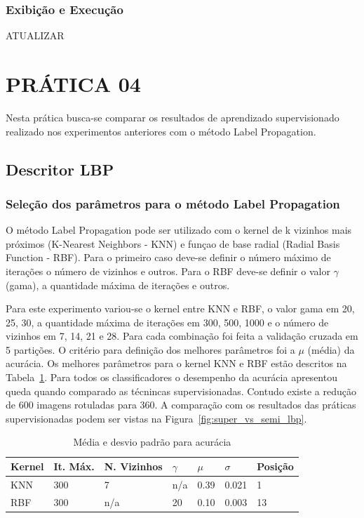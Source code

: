 \documentclass[a4paper, 12 pt, conference]{ieeeconf}  %
\begin{document}
\subsubsection{Exibição e Execução} ATUALIZAR

\section{PRÁTICA 04}
\label{pratica04}
Nesta prática busca-se comparar os resultados de aprendizado supervisionado realizado nos experimentos anteriores com o método Label Propagation.

\subsection{Descritor LBP}
\subsubsection{Seleção dos parâmetros para o método Label Propagation}
O método Label Propagation pode ser utilizado com o kernel de k vizinhos mais próximos (K-Nearest Neighbors - KNN) e funçao de base radial (Radial Basis Function - RBF). Para o  primeiro caso deve-se definir o número máximo de iterações o número de vizinhos e outros. Para o RBF deve-se definir o valor $\gamma$ (gama), a quantidade máxima de iterações e outros.

Para este experimento variou-se o kernel entre KNN e RBF, o valor gama em 20, 25, 30, a quantidade máxima de iterações em 300, 500, 1000 e o número de vizinhos em 7, 14, 21 e 28. Para cada combinação foi feita a validação cruzada em 5 partições. O critério para definição dos melhores parâmetros foi a $\mu$ (média) da acurácia. Os melhores parâmetros para o kernel KNN e RBF estão descritos na Tabela~\ref{tab:meida_acuracia_lp_lbp}. Para todos os classificadores o desempenho da acurácia apresentou queda quando comparado as técnincas supervisionadas. Contudo existe a redução de 600 imagens rotuladas para 360. A comparação com os resultados das práticas supervisionadas podem ser vistas na Figura~\ref{fig:super_vs_semi_lbp}.


\begin{table}[!htbp]
    \caption{Média e desvio padrão para acurácia}
    \begin{center}
        \begin{tabular}{lllllll}
        	Kernel & It. Máx. & N. Vizinhos & $\gamma$ & $\mu$ & $\sigma$ & Posição \\
        	\hline
        	KNN    & 300             & 7                  & n/a  & 0.39       & 0.021               & 1       \\
        	\hline
        	RBF    & 300             & n/a                & 20   & 0.10       & 0.003               & 13      \\
        \end{tabular}
    \label{tab:meida_acuracia_lp_lbp}
    \end{center}
\end{table}
\end{document}
